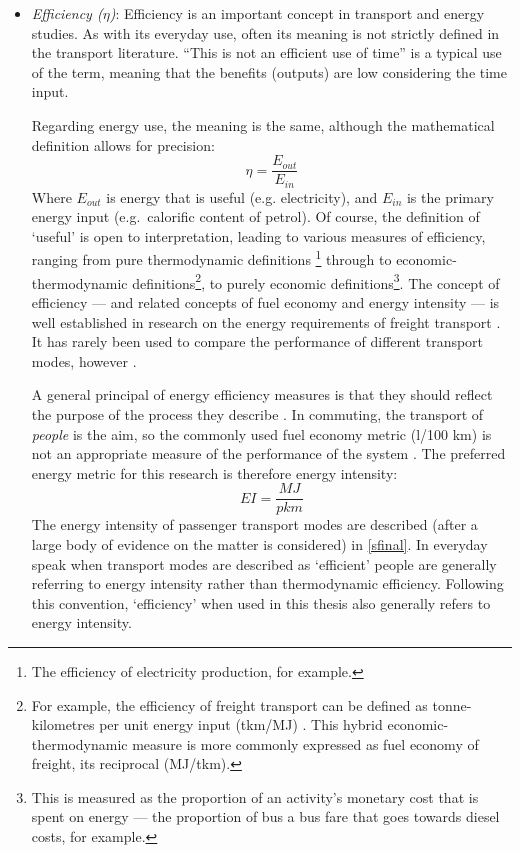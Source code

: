 \documentclass[a4paper, 11pt, twoside]{Thesis}
\begin{document}
\begin{itemize}
\item \emph{Efficiency ($\eta$)}: Efficiency is an important concept in
transport and energy studies. As with its everyday use, often its meaning
is not strictly defined in the transport literature. ``This is not an
efficient use of time'' is a typical use of the term, meaning that the
benefits (outputs) are low considering the time input. 

Regarding energy use, the meaning is the same, although the mathematical
definition allows for precision:
\begin{equation}
 \eta = \frac{E_{out}}{E_{in}}
\end{equation}
Where $E_{out}$ is energy that is useful (e.g. electricity), and $E_{in}$ is
the primary energy input (e.g.\ calorific content of petrol). Of course, the
definition of `useful' is open to interpretation\citep{Patterson1996}, leading
to various measures of efficiency, ranging from pure thermodynamic definitions
\footnote{The efficiency of electricity production, for example.}
through to
economic-thermodynamic definitions\footnote{For example, the efficiency of
freight transport can be defined as tonne-kilometres per unit energy input
(tkm/MJ) \citep{Simongati2010}. This hybrid economic-thermodynamic measure is
more commonly expressed as fuel economy of freight, its reciprocal
(MJ/tkm).},
to purely economic definitions\footnote{This is measured as the proportion of
an activity's monetary cost that is spent on energy --- the proportion of bus a
bus fare that goes towards diesel costs, for example.}. The concept of
efficiency --- and related concepts of fuel economy and energy
intensity --- is well established in research on the energy requirements
of freight transport \citep{Kamakate2009}. It has rarely been used to compare
the performance of different transport modes, however \citep{Fels1975,
Lovelace2011-assessing}.

A general principal of energy efficiency measures is that they should reflect
the purpose of the process they describe \citep{Patterson1996}. In commuting,
the transport of \emph{people} is the aim, so the commonly used fuel economy
metric (l/100 km) is not an appropriate measure of the  performance of the
system \citep{MacKay2009}. The preferred energy metric for this research is
therefore energy intensity:
\begin{equation}
 EI = \frac{MJ}{pkm}
\end{equation}
The energy intensity of passenger transport modes are described
(after a large body of evidence on the matter is considered) in \cref{sfinal}.
In everyday speak when transport modes are described as `efficient' people
are generally referring to energy intensity rather than thermodynamic
efficiency. Following this convention, `efficiency' when used in this thesis
also generally refers to energy intensity.


\end{itemize}
\end{document}
